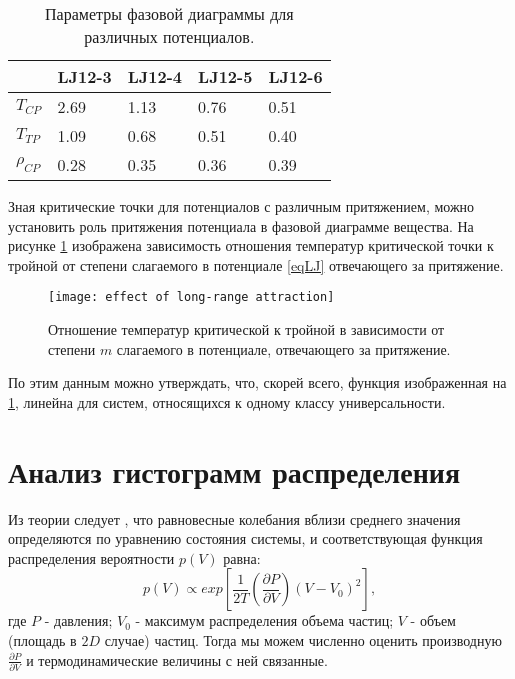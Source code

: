 \begin{table}[h]
\begin{center}
\begin{tabular}{| l | l | l | l | l |}
\hline
    & LJ12-3 & LJ12-4 & LJ12-5 & LJ12-6         \\ \hline
$T_{CP}$    & 2.69  &  1.13   &  0.76  &    0.51   \\ \hline
$T_{TP}$    & 1.09  & 0.68    & 0.51   & 0.40   \\ \hline
$\rho_{CP}$ & 0.28  &  0.35   &  0.36   &  0.39   \\ \hline
\end{tabular}
\end{center}
\caption{Параметры фазовой диаграммы для различных потенциалов.}
\label{tablSystemConst}
\end{table}

Зная критические точки для потенциалов с различным притяжением, можно установить роль притяжения потенциала в фазовой диаграмме вещества. На рисунке \ref{risTcpTtp} изображена зависимость отношения температур критической точки к тройной от степени слагаемого в потенциале \ref{eqLJ} отвечающего за притяжение. 


\begin{figure}[h]
\begin{center}
\texttt{[image: effect of long-range attraction]}
\caption{Отношение температур критической к тройной в зависимости от степени $m$ слагаемого в потенциале, отвечающего за притяжение.}
\label{risTcpTtp}
\end{center}
\end{figure}

По этим данным можно утверждать, что, скорей всего, функция изображенная на \ref{risTcpTtp}, линейна для систем, относящихся к одному классу универсальности.


\section{Анализ гистограмм распределения}\label{C2_3}

Из теории следует \cite{Landau}, что равновесные колебания вблизи среднего значения определяются по уравнению состояния системы, и соответствующая функция распределения вероятности $p(V)$ равна:
\begin{equation}
p(V) \varpropto exp \left[ \frac{1}{2T} \left( \frac{\partial P}{\partial V} \right)  \left(V - V_0 \right)^2 \right],
\label{eqPv}
\end{equation}
где $P$ - давления; $V_0$ - максимум распределения объема частиц; $V$ - объем (площадь в $2D$ случае) частиц.
Тогда мы можем численно оценить производную $\frac{\partial P}{\partial V}$ и термодинамические величины с ней связанные.

